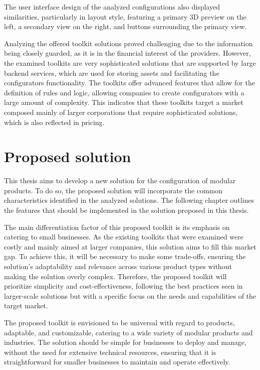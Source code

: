 The user interface design of the analyzed configurations also displayed similarities, particularly in layout style, featuring a primary 3D preview on the left, a secondary view on the right, and buttons surrounding the primary view.

Analyzing the offered toolkit solutions proved challenging due to the information being closely guarded, as it is in the financial interest of the providers. However, the examined toolkits are very sophisticated solutions that are supported by large backend services, which are used for storing assets and facilitating the configurators functionality. The toolkits offer advanced features that allow for the definition of rules and logic, allowing companies to create configurators with a large amount of complexity. This indicates that these toolkits target a market composed mainly of larger corporations that require sophisticated solutions, which is also reflected in pricing.

\section{Proposed solution}

This thesis aims to develop a new solution for the configuration of modular products. To do so, the proposed solution will incorporate the common characteristics identified in the analyzed solutions. The following chapter outlines the features that should be implemented in the solution proposed in this thesis.

The main differentiation factor of this proposed toolkit is its emphasis on catering to small businesses. As the existing toolkits that were examined were costly and mainly aimed at larger companies, this solution aims to fill this market gap. To achieve this, it will be necessary to make some trade-offs, ensuring the solution's adaptability and relevance across various product types without making the solution overly complex. Therefore, the proposed toolkit will prioritize simplicity and cost-effectiveness, following the best practices seen in larger-scale solutions but with a specific focus on the needs and capabilities of the target market.
 
The proposed toolkit is envisioned to be universal with regard to products, adaptable, and customizable, catering to a wide variety of modular products and industries. The solution should be simple for businesses to deploy and manage, without the need for extensive technical resources, ensuring that it is straightforward for smaller businesses to maintain and operate effectively.

